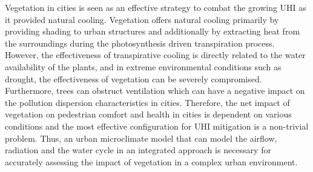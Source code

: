 
Vegetation in cities is seen as an effective strategy to combat the growing UHI as it provided natural cooling. Vegetation offers natural cooling primarily by providing shading to urban structures and additionally by extracting heat from the surroundings during the photosynthesis driven transpiration process. However, the effectiveness of transpirative cooling is directly related to the water availability of the plants, and in extreme environmental conditions such as drought, the effectiveness of vegetation can be severely compromised. Furthermore, trees can obstruct ventilation which can have a negative impact on the pollution dispersion characteristics in cities. Therefore, the net impact of vegetation on pedestrian comfort and health in cities is dependent on various conditions and the most effective configuration for UHI mitigation is a non-trivial problem. Thus, an urban microclimate model that can model the airflow, radiation and the water cycle in an integrated approach is necessary for accurately assessing the impact of vegetation in a complex urban environment. 


